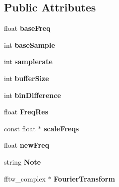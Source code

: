 \subsection*{Public Attributes}
\begin{DoxyCompactItemize}
\item 
\hypertarget{classVocoder_a47e8c37097fafbe8bd8a87adba84e5f1}{float {\bfseries base\-Freq}}\label{classVocoder_a47e8c37097fafbe8bd8a87adba84e5f1}

\item 
\hypertarget{classVocoder_ad4f1e12813090bb2a980be7aa3bac471}{int {\bfseries base\-Sample}}\label{classVocoder_ad4f1e12813090bb2a980be7aa3bac471}

\item 
\hypertarget{classVocoder_a7fa47ae2edf71aeb5b36e875bb440667}{int {\bfseries samplerate}}\label{classVocoder_a7fa47ae2edf71aeb5b36e875bb440667}

\item 
\hypertarget{classVocoder_a38c9aa4fad739f7577e51fc3d4891751}{int {\bfseries buffer\-Size}}\label{classVocoder_a38c9aa4fad739f7577e51fc3d4891751}

\item 
\hypertarget{classVocoder_acd33a5938c9167429b2a4cd8c58374ae}{int {\bfseries bin\-Difference}}\label{classVocoder_acd33a5938c9167429b2a4cd8c58374ae}

\item 
\hypertarget{classVocoder_a37c560acdf34330a9b7d77d418da3229}{float {\bfseries Freq\-Res}}\label{classVocoder_a37c560acdf34330a9b7d77d418da3229}

\item 
\hypertarget{classVocoder_a5a93206230e57f5aee12de489dac2a31}{const float $\ast$ {\bfseries scale\-Freqs}}\label{classVocoder_a5a93206230e57f5aee12de489dac2a31}

\item 
\hypertarget{classVocoder_a77dcc19311b4905125bf609084b4ad2a}{float {\bfseries new\-Freq}}\label{classVocoder_a77dcc19311b4905125bf609084b4ad2a}

\item 
\hypertarget{classVocoder_a671b6ee1eecfa30c4b9f93b0e23364a5}{string {\bfseries Note}}\label{classVocoder_a671b6ee1eecfa30c4b9f93b0e23364a5}

\item 
\hypertarget{classVocoder_a87743dbc6e595d8fe1899d6987263008}{fftw\-\_\-complex $\ast$ {\bfseries Fourier\-Transform}}\label{classVocoder_a87743dbc6e595d8fe1899d6987263008}

\end{DoxyCompactItemize}


